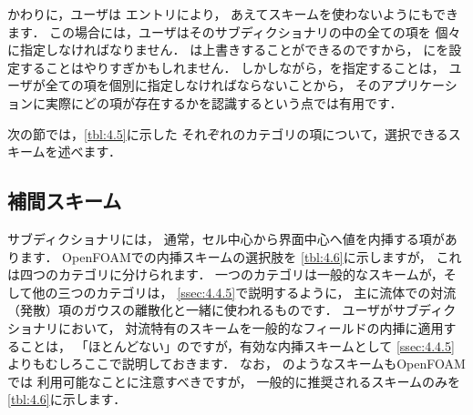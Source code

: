 かわりに，ユーザは
%
%
エントリにより，
あえてスキームを使わないようにもできます．
この場合には，ユーザはそのサブディクショナリの中の全ての項を
個々に指定しなければなりません．
は上書きすることができるのですから，
にを設定することはやりすぎかもしれません．
しかしながら，を指定することは，
ユーザが全ての項を個別に指定しなければならないことから，
そのアプリケーションに実際にどの項が存在するかを認識するという点では有用です．

次の節では，\autoref{tbl:4.5}に示した
それぞれのカテゴリの項について，選択できるスキームを述べます．


\subsection{補間スキーム}
\label{ssec:4.4.1}
サブディクショナリには，
通常，セル中心から界面中心へ値を内挿する項があります．
OpenFOAMでの内挿スキームの選択肢を
\autoref{tbl:4.6}に示しますが，
これは四つのカテゴリに分けられます．
一つのカテゴリは一般的なスキームが，そして他の三つのカテゴリは，
\autoref{ssec:4.4.5}で説明するように，
主に流体での対流（発散）項のガウスの離散化と一緒に使われるものです．
ユーザがサブディクショナリにおいて，
対流特有のスキームを一般的なフィールドの内挿に適用することは，
「ほとんどない」のですが，有効な内挿スキームとして
\autoref{ssec:4.4.5}よりもむしろここで説明しておきます．
なお，
%
%
のようなスキームもOpenFOAMでは
利用可能なことに注意すべきですが，
一般的に推奨されるスキームのみを\autoref{tbl:4.6}に示します．

